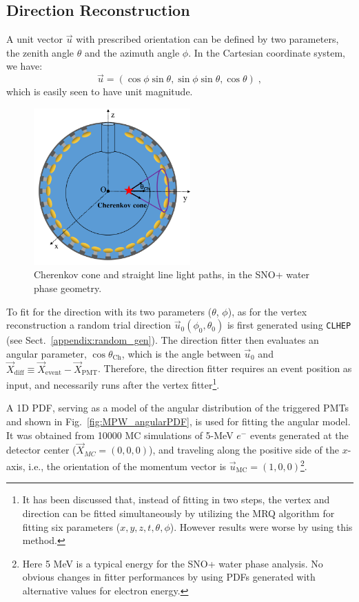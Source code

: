 \subsection{Direction Reconstruction}\label{sect:waterDirection}

A unit vector $\vec{u}$ with prescribed orientation can be defined by two parameters, the zenith angle $\theta$ and the azimuth angle $\phi$. In the Cartesian coordinate system, we have: 
\begin{equation}
\vec{u}=(\cos\phi\sin\theta,\sin\phi\sin\theta,\cos\theta) \;, 
\end{equation}
which is easily seen to have unit magnitude.

\begin{figure}[htbp]
	\centering
	\includegraphics[width=6cm]{mpwDiagram2_coord.png}
	\caption[Cherenkov cone and straight line light paths (SNO+ water phase).]{Cherenkov cone and straight line light paths, in the SNO+ water phase geometry.}
	\label{mpwdiagram_direction}
\end{figure}
To fit for the direction with its two parameters ($\theta$, $\phi$), as for the vertex reconstruction a random trial direction $\vec{u}_0(\phi_0,\theta_0)$ is first generated using \texttt{CLHEP} (see Sect.~\ref{appendix:random_gen}). The direction fitter then evaluates an angular parameter, $\cos\theta_{\mathrm{Ch}}$, which is the angle between $\vec{u}_{0}$ and $\vec{X}_{\mathrm{diff}}\equiv \vec{X}_{\mathrm{event}}-\vec{X}_{\mathrm{PMT}}$. Therefore, the direction fitter requires an event position as input, and necessarily runs after the vertex fitter\footnote{It has been discussed that, instead of fitting in two steps, the vertex and direction can be fitted simultaneously by utilizing the MRQ algorithm for fitting six parameters ($x,y,z,t,\theta,\phi$). However results were worse by using this method.}.

A 1D PDF, serving as a model of the angular distribution of the triggered PMTs and shown in Fig.~\ref{fig:MPW_angularPDF}, is used for fitting the angular model. It was obtained from 10000 MC simulations of 5-MeV $e^-$ events generated at the detector center ($\vec{X}_{MC}=(0,0,0)$), and traveling along the positive side of the $x$-axis, i.e., the orientation of the momentum vector is $\vec{u}_{\mathrm{MC}}=(1,0,0)$\footnote{Here 5 MeV is a typical energy for the SNO+ water phase analysis. No obvious changes in fitter performances by using PDFs generated with alternative values for electron energy.}.

